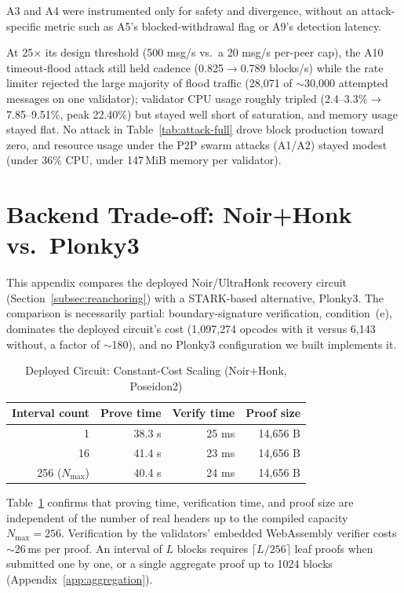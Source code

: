 A3 and A4 were instrumented only for safety and divergence, without an
attack-specific metric such as A5's blocked-withdrawal flag or A9's
detection latency.

At 25$\times$ its design threshold (500 msg/s vs.\ a 20 msg/s per-peer cap),
the A10 timeout-flood attack still held cadence (0.825$\to$0.789 blocks/s)
while the rate limiter rejected the large majority of flood traffic
(28{,}071 of $\sim$30{,}000 attempted messages on one validator); validator
CPU usage roughly tripled (2.4--3.3\%$\to$7.85--9.51\%, peak 22.40\%) but
stayed well short of saturation, and memory usage stayed flat. No attack in
Table~\ref{tab:attack-full} drove block production toward zero, and resource
usage under the P2P swarm attacks (A1/A2) stayed modest (under 36\% CPU,
under 147\,MiB memory per validator).

\FloatBarrier
\section{Backend Trade-off: Noir+Honk vs.\ Plonky3}
\label{app:backend}

This appendix compares the deployed Noir/UltraHonk recovery circuit
(Section~\ref{subsec:reanchoring}) with a STARK-based alternative, Plonky3.
The comparison is necessarily partial: boundary-signature verification,
condition~(e), dominates the deployed circuit's cost (1{,}097{,}274 opcodes
with it versus 6{,}143 without, a factor of $\sim$180), and no Plonky3
configuration we built implements it.

\begin{table}[h]
\caption{Deployed Circuit: Constant-Cost Scaling (Noir+Honk, Poseidon2)}
\label{tab:reanchor-scaling}
\centering
\footnotesize
\begin{tabular}{@{}rrrr@{}}
\toprule
\textbf{Interval count} & \textbf{Prove time} & \textbf{Verify time} & \textbf{Proof size} \\
\midrule
1   & 38.3 s & 25 ms & 14{,}656 B \\
16  & 41.4 s & 23 ms & 14{,}656 B \\
256 ($N_{\max}$) & 40.4 s & 24 ms & 14{,}656 B \\
\bottomrule
\end{tabular}
\end{table}

Table~\ref{tab:reanchor-scaling} confirms that proving time, verification
time, and proof size are independent of the number of real headers up to
the compiled capacity $N_{\max}{=}256$. Verification by the validators'
embedded WebAssembly verifier costs $\sim$26\,ms per proof. An interval of
$L$ blocks requires $\lceil L/256 \rceil$ leaf proofs when submitted one by one,
or a single aggregate proof up to 1024 blocks (Appendix~\ref{app:aggregation}).

